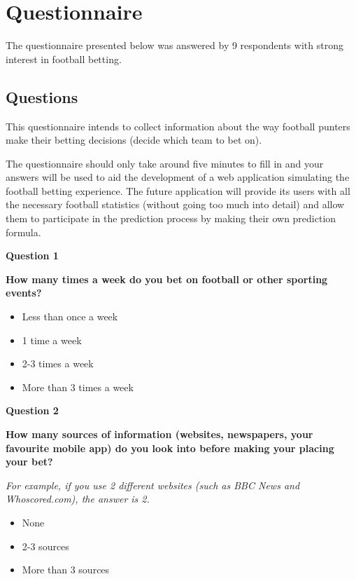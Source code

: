 \chapter{Questionnaire}
\label{ch:questionnaire_appendix}
The questionnaire presented below was answered by 9 respondents with strong interest in football betting. 

\section{Questions}
This questionnaire intends to collect information about the way football punters make their betting decisions (decide which team to bet on).

The questionnaire should only take around five minutes to fill in and your answers will be used to aid the development of a web application simulating the football betting experience. The future application will provide its users with all the necessary football statistics (without going too much into detail) and allow them to participate in the prediction process by making their own prediction formula. 

\textbf{Question 1}\par
\textbf{How many times a week do you bet on football or other sporting events?}
\begin{itemize}
	\item Less than once a week
	\item 1 time a week
	\item 2-3 times a week
 	\item More than 3 times a week
 \end{itemize}
 
\textbf{Question 2}\par
\textbf{How many sources of information (websites, newspapers, your favourite mobile app) do you look into before making your placing your bet?}\par
\emph{For example, if you use 2 different websites (such as BBC News and Whoscored.com), the answer is 2.}
 \begin{itemize}
 	\item None
 	\item 2-3 sources
 	\item More than 3 sources
 \end{itemize}
 
